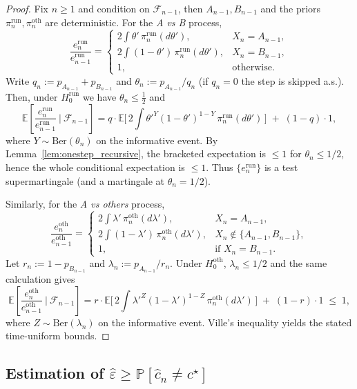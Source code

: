 \begin{proof}
Fix $n\ge1$ and condition on $\mathcal F_{n-1}$, then $A_{n-1},B_{n-1}$ and the priors
$\pi^{\mathrm{run}}_n,\pi^{\mathrm{oth}}_n$ are deterministic. For the \emph{A vs B} process,
\[
\frac{e^{\mathrm{run}}_n}{e^{\mathrm{run}}_{n-1}}
=\begin{cases}
2\!\int \theta'\,\pi^{\mathrm{run}}_n(d\theta'), & X_n=A_{n-1},\\
2\!\int (1-\theta')\,\pi^{\mathrm{run}}_n(d\theta'), & X_n=B_{n-1},\\
1, & \text{otherwise.}
\end{cases}
\]
Write $q_n:=p_{A_{n-1}}+p_{B_{n-1}}$ and $\theta_n:=p_{A_{n-1}}/q_n$ (if $q_n=0$ the step is skipped a.s.).
Then, under $H^{\mathrm{run}}_0$ we have $\theta_n\le \tfrac12$ and
\[
\mathbb E\!\left[\frac{e^{\mathrm{run}}_n}{e^{\mathrm{run}}_{n-1}}\ \Big|\ \mathcal F_{n-1}\right]
= q\cdot \mathbb E\!\Big[\,2\!\int \theta'^{Y}(1-\theta')^{1-Y}\,\pi^{\mathrm{run}}_n(d\theta')\,\Big]
\;+\; (1-q)\cdot 1,
\]
where $Y\sim\mathrm{Ber}(\theta_n)$ on the informative event. By Lemma~\ref{lem:onestep_recursive},
the bracketed expectation is $\le 1$ for $\theta_n\le 1/2$, hence the whole conditional expectation is $\le 1$.
Thus $\{e^{\mathrm{run}}_n\}$ is a test supermartingale (and a martingale at $\theta_n=1/2$).

Similarly, for the \emph{A vs others} process,
\[
\frac{e^{\mathrm{oth}}_n}{e^{\mathrm{oth}}_{n-1}}
=\begin{cases}
2\!\int \lambda'\,\pi^{\mathrm{oth}}_n(d\lambda'), & X_n=A_{n-1},\\
2\!\int (1-\lambda')\,\pi^{\mathrm{oth}}_n(d\lambda'), & X_n\notin\{A_{n-1},B_{n-1}\},\\
1, & \text{if } X_n=B_{n-1}.
\end{cases}
\]
Let $r_n:=1-p_{B_{n-1}}$ and $\lambda_n:=p_{A_{n-1}}/r_n$. Under $H^{\mathrm{oth}}_0$, $\lambda_n\le 1/2$ and the same calculation gives
\[
\mathbb E\!\left[\frac{e^{\mathrm{oth}}_n}{e^{\mathrm{oth}}_{n-1}}\ \Big|\ \mathcal F_{n-1}\right]
= r\cdot \mathbb E\!\Big[\,2\!\int \lambda'^{Z}(1-\lambda')^{1-Z}\,\pi^{\mathrm{oth}}_n(d\lambda')\,\Big]
\;+\; (1-r)\cdot 1 \;\le\; 1,
\]
where $Z\sim\mathrm{Ber}(\lambda_n)$ on the informative event. Ville’s inequality yields the stated time-uniform bounds.
\end{proof}

\subsection{Estimation of $\widehat{\varepsilon}\geq \mathbb{P}[\hat{c}_n\neq c^\star]$}\label{app:subsec_estimator_proability}


